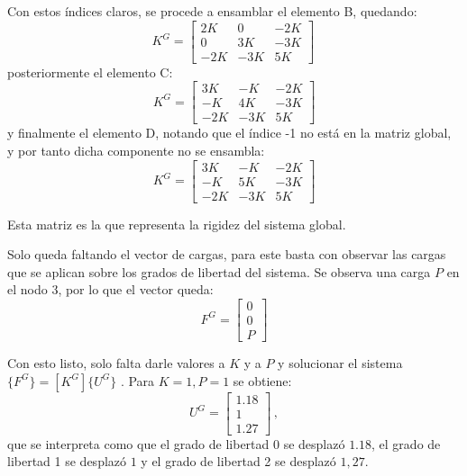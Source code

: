 Con estos índices claros, se procede a ensamblar el elemento B, quedando:
$$K^G = 
\begin{bmatrix}
2K & 0 & -2K \\
0 & 3K & -3K \\
-2K & -3K & 5K 
\end{bmatrix}\, 
$$
posteriormente el elemento C:
$$K^G = 
\begin{bmatrix}
3K & -K & -2K \\
-K & 4K & -3K \\
-2K & -3K & 5K 
\end{bmatrix}
$$
y finalmente el elemento D, notando que el índice -1 no está en la matriz 
global, y por tanto dicha componente no se ensambla:
$$K^G = 
\begin{bmatrix}
3K & -K & -2K \\
-K & 5K & -3K \\
-2K & -3K & 5K 
\end{bmatrix}
$$

Esta matriz es la que representa la rigidez del sistema global.

Solo queda faltando el vector de cargas, para este basta con observar las 
cargas que se aplican sobre los grados de libertad del sistema. Se observa una 
carga $P$ en el nodo 3, por lo que el vector queda: 
$$F^G = 
\begin{bmatrix}
0 \\
0 \\
P
\end{bmatrix}
$$

Con esto listo, solo falta darle valores a $K$ y a $P$ y solucionar el sistema  
$ \{ F^G \} = [ K^G ] \{ U^G \}$ . Para $K = 1, P = 1$ se obtiene:
$$U^G = 
\begin{bmatrix}
1.18 \\
1 \\
1.27
\end{bmatrix}\, ,
$$
que se interpreta como que el grado de libertad 0 se desplazó $1.18$, el 
grado de libertad 1 se desplazó $1$ y el grado de libertad 2 se desplazó 
$1,27$.

